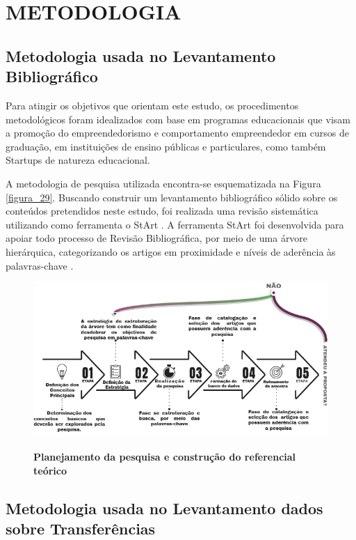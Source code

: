 \chapter{METODOLOGIA}

\section{Metodologia usada no Levantamento Bibliográfico}


Para atingir os objetivos que orientam este estudo, os procedimentos metodológicos foram idealizados com base em programas educacionais que visam a promoção do empreendedorismo e comportamento empreendedor em cursos de graduação, em instituições de ensino públicas e particulares, como também Startups de natureza educacional.


A metodologia de pesquisa utilizada encontra-se esquematizada na Figura \ref{figura_29}. Buscando construir um levantamento bibliográfico sólido sobre os conteúdos pretendidos neste estudo, foi realizada uma revisão sistemática utilizando como ferramenta o StArt \cite{lapes_start_2016}. A ferramenta StArt foi desenvolvida para apoiar todo processo de Revisão Bibliográfica, por meio de uma árvore hierárquica, categorizando os artigos em proximidade e níveis de aderência às palavras-chave \cite{hernandes_avaliacao_2010}.


\begin{figure}[H]
\centering
\caption{\textbf{Planejamento da pesquisa e construção do referencial teórico}}
\includegraphics[scale=0.6]{Imagens/fases_pesquisa_bibliografica.png}
\label{figura_referencial}
\end{figure}

\section{Metodologia usada no Levantamento dados sobre Transferências}

